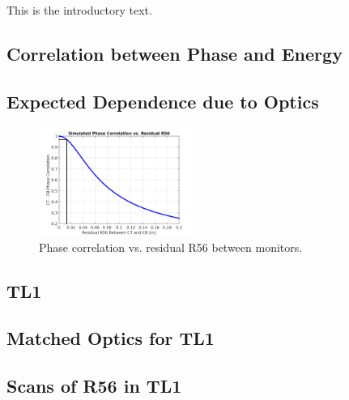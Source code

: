 
This is the introductory text.



\subsection{Correlation between Phase and Energy}
\label{ss:corrPhaseEnergy}

\subsection{Expected Dependence due to Optics}
\label{ss:r56Sim}

\begin{figure}
  \centering
  \includegraphics[width=0.45\textwidth]{Figures/R56_corrSim}
  \caption{Phase correlation vs. residual R56 between monitors.}
  \label{f:R56_corrSim}
\end{figure}


\subsection{TL1}
\label{ss:tl1}

\subsection{Matched Optics for TL1}
\label{ss:tl1Optics}

\subsection{Scans of R56 in TL1}
\label{ss:r56Scans}


